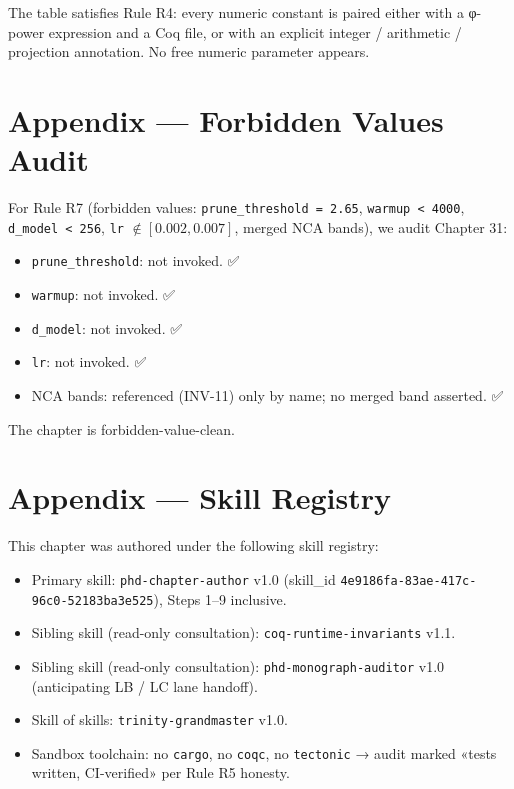 The table satisfies Rule R4: every numeric constant is paired either with a φ-power expression and a Coq file, or with an explicit integer / arithmetic / projection annotation. No free numeric parameter appears.

\section{Appendix — Forbidden Values Audit}
\label{sec:31-forbidden}

For Rule R7 (forbidden values: \texttt{prune\_threshold = 2.65}, \texttt{warmup < 4000}, \texttt{d\_model < 256}, \texttt{lr} $\notin [0.002, 0.007]$, merged NCA bands), we audit Chapter 31:

\begin{itemize}
    \item \texttt{prune\_threshold}: not invoked. ✅
    \item \texttt{warmup}: not invoked. ✅
    \item \texttt{d\_model}: not invoked. ✅
    \item \texttt{lr}: not invoked. ✅
    \item NCA bands: referenced (INV-11) only by name; no merged band asserted. ✅
\end{itemize}

The chapter is forbidden-value-clean.

\section{Appendix — Skill Registry}
\label{sec:31-skill-registry}

This chapter was authored under the following skill registry:

\begin{itemize}
    \item Primary skill: \texttt{phd-chapter-author} v1.0 (skill\_id \texttt{4e9186fa-83ae-417c-96c0-52183ba3e525}), Steps 1–9 inclusive.
    \item Sibling skill (read-only consultation): \texttt{coq-runtime-invariants} v1.1.
    \item Sibling skill (read-only consultation): \texttt{phd-monograph-auditor} v1.0 (anticipating LB / LC lane handoff).
    \item Skill of skills: \texttt{trinity-grandmaster} v1.0.
    \item Sandbox toolchain: no \texttt{cargo}, no \texttt{coqc}, no \texttt{tectonic} → audit marked «tests written, CI-verified» per Rule R5 honesty.
\end{itemize}

